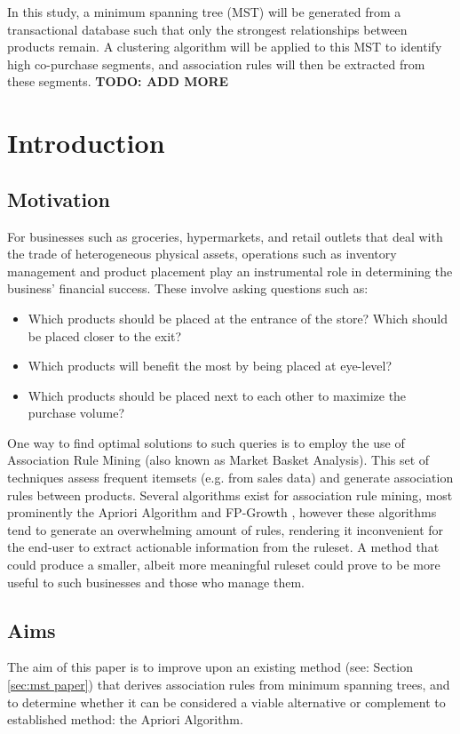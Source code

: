 \documentclass[paper=a4,fontsize=11pt]{article}	%
\begin{document}
In this study, a minimum spanning tree (MST) will be generated from a transactional database such that only the strongest relationships between products remain. A clustering algorithm will be applied to this MST to identify high co-purchase segments, and association rules will then be extracted from these segments. \textbf{TODO: ADD MORE}

\newpage\tableofcontents\newpage

\setcounter{page}{1}		%
\section{Introduction}
\subsection{Motivation}
For businesses such as groceries, hypermarkets, and retail outlets that deal with the trade of heterogeneous physical assets, operations such as inventory management and product placement play an instrumental role in determining the business' financial success. These involve asking questions such as:
\begin{itemize}
\item Which products should be placed at the entrance of the store? Which should be placed closer to the exit?
\item Which products will benefit the most by being placed at eye-level?
\item Which products should be placed next to each other to maximize the purchase volume?
\end{itemize}
One way to find optimal solutions to such queries is to employ the use of Association Rule Mining (also known as Market Basket Analysis). This set of techniques assess frequent itemsets (e.g. from sales data) and generate association rules between products. 
Several algorithms exist for association rule mining, most prominently the Apriori Algorithm \cite{apriori} and FP-Growth \cite{fp_growth}, however these algorithms tend to generate an overwhelming amount of rules, rendering it inconvenient for the end-user to extract actionable information from the ruleset. A method that could produce a smaller, albeit more meaningful ruleset could prove to be more useful to such businesses and those who manage them.

\subsection{Aims}
The aim of this paper is to improve upon an existing method (see: Section \ref{sec:mst paper}) that derives association rules from minimum spanning trees, and to determine whether it can be considered a viable alternative or complement to established method: the Apriori Algorithm.
\end{document}
